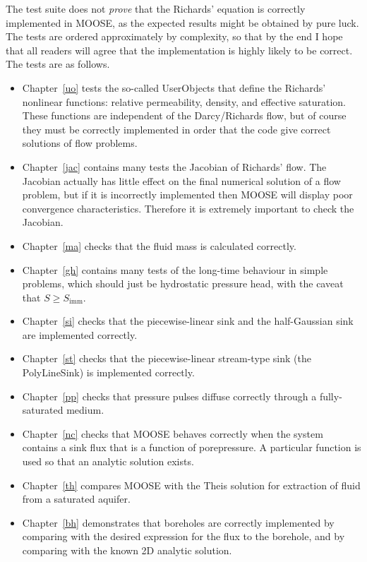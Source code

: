\documentclass[]{scrreprt}
\begin{document}
The test suite does not {\em prove} that the Richards' equation is
correctly implemented in MOOSE, as the expected results might be
obtained by pure luck.  The tests are ordered approximately by
complexity, so that by the end I hope that all readers will agree that
the implementation is highly likely to be correct.  The tests are as
follows.
\begin{itemize}
\item Chapter~\ref{uo} tests the so-called UserObjects that define the
 Richards' nonlinear functions: relative permeability, density, and
 effective saturation.  These functions are independent of the
 Darcy/Richards flow, but of course they must be correctly implemented
 in order that the code give correct solutions of flow problems.
\item Chapter~\ref{jac} contains many tests the Jacobian of Richards'
  flow.  The Jacobian actually has little effect on the final
  numerical solution of a flow problem, but if it is incorrectly
  implemented then MOOSE will display poor convergence
  characteristics.  Therefore it is extremely important to check the
  Jacobian.
\item Chapter~\ref{ma} checks that the fluid mass is calculated correctly.
\item Chapter~\ref{gh} contains many tests of the long-time behaviour
  in simple problems, which should just be hydrostatic pressure head,
  with the caveat that $S\geq S_{\mathrm{imm}}$.
\item Chapter~\ref{si} checks that the piecewise-linear sink and the
  half-Gaussian sink are implemented correctly.
\item Chapter~\ref{st} checks that the piecewise-linear stream-type
  sink (the PolyLineSink) is implemented correctly.
\item Chapter~\ref{pp} checks that pressure pulses diffuse correctly
  through a fully-saturated medium.
\item Chapter~\ref{nc} checks that MOOSE behaves correctly when the
  system contains a sink flux that is a function of porepressure.  A
  particular function is used so that an analytic solution exists.
\item Chapter~\ref{th} compares MOOSE with the Theis solution for
  extraction of fluid from a saturated aquifer.
\item Chapter~\ref{bh} demonstrates that boreholes are correctly
  implemented by comparing with the desired expression for the flux to
  the borehole, and by comparing with the known 2D analytic solution.

\end{itemize}
\end{document}

